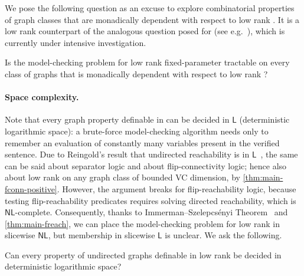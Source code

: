 We pose the following question as an excuse to explore combinatorial properties of graph classes that are monadically dependent with respect to low rank \mso. It is a low rank \mso counterpart of the analogous question posed for \fo (see e.g.~\cite[Conjecture~2]{Pilipczuk25}), which is currently under intensive investigation.

\begin{question}
 Is the model-checking problem for low rank \mso fixed-parameter tractable on every class of graphs that is monadically dependent with respect to low rank \mso?
\end{question}

\paragraph*{Space complexity.} Note that every graph property definable in \fo can be decided in $\mathsf{L}$ (deterministic logarithmic space): a brute-force model-checking algorithm needs only to remember an evaluation of constantly many variables present in the verified sentence. Due to Reingold's result that undirected reachability is in $\mathsf{L}$~\cite{Reingold08}, the same can be said about separator logic and about flip-connectivity logic; hence also about low rank \mso on any graph class of bounded VC dimension, by \cref{thm:main-fconn-positive}. However, the argument breaks for flip-reachability logic, because testing flip-reachability predicates requires solving directed reachability, which is $\mathsf{NL}$-complete. Consequently, thanks to Immerman--Szelepcs\'enyi
 Theorem~\cite{Immerman88,Szelepcsenyi88} and \cref{thm:main-freach}, we can place the model-checking problem for low rank \mso in slicewise $\mathsf{NL}$, but membership in slicewise $\mathsf{L}$ is unclear. We ask the following.

 \begin{question}
  Can every property of undirected graphs definable in low rank \mso be decided in deterministic logarithmic space?
 \end{question}

